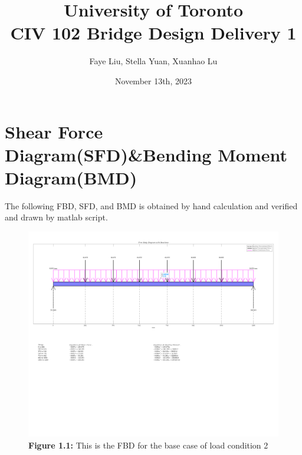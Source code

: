 \documentclass[12pt,titlepage,a4paper]{article}
\begin{document}
\title{University of Toronto \\ CIV 102 Bridge Design Delivery 1}
\author{Faye Liu, Stella Yuan, Xuanhao Lu}
\date{November 13th, 2023}
\maketitle


\section{Shear Force Diagram(SFD)\&Bending Moment Diagram(BMD)}
    The following FBD, SFD, and BMD is obtained by hand calculation and verified and drawn by matlab script.
    \begin{figure}[H]
        \centering
        \includegraphics[width=13cm]{Delivery_1_FBD.png}
        \caption*{\textbf{Figure 1.1:} This is the FBD for the base case of load condition 2}
        \label{fig:enter-label}
    \end{figure}
\end{document}
